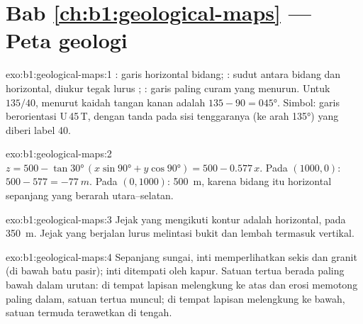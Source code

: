 \section*{Bab \ref{ch:b1:geological-maps} --- Peta geologi}

\begin{solution}{exo:b1:geological-maps:1}
:  garis horizontal bidang; : sudut antara bidang dan horizontal, diukur tegak lurus ; :  garis paling curam yang menurun. Untuk $135/40$,  menurut kaidah tangan kanan adalah $135 - 90 = \ang{045}$. Simbol: garis  berorientasi
U\,45\,T, dengan tanda pada sisi tenggaranya (ke arah \ang{135}) yang diberi label 40.
\end{solution}

\begin{solution}{exo:b1:geological-maps:2}
$z = 500 - \tan\ang{30}\,(x\sin\ang{90} + y\cos\ang{90}) = 500 - 0.577\,x$.
Pada $(1000, 0)$: $500 - 577 = \qty{-77}{m}$. Pada $(0, 1000)$: \qty{500}{m}, karena bidang itu horizontal sepanjang  yang berarah utara--selatan.
\end{solution}

\begin{solution}{exo:b1:geological-maps:3}
Jejak yang mengikuti kontur adalah  horizontal, pada \qty{350}{m}. Jejak yang berjalan lurus melintasi bukit dan lembah termasuk  vertikal.
\end{solution}

\begin{solution}{exo:b1:geological-maps:4}
Sepanjang sungai, inti  memperlihatkan sekis dan granit (di bawah batu pasir); inti  ditempati oleh kapur. Satuan tertua berada paling bawah dalam urutan: di tempat lapisan melengkung ke atas dan erosi memotong paling dalam, satuan tertua muncul; di tempat lapisan melengkung ke bawah, satuan termuda terawetkan di tengah.
\end{solution}

